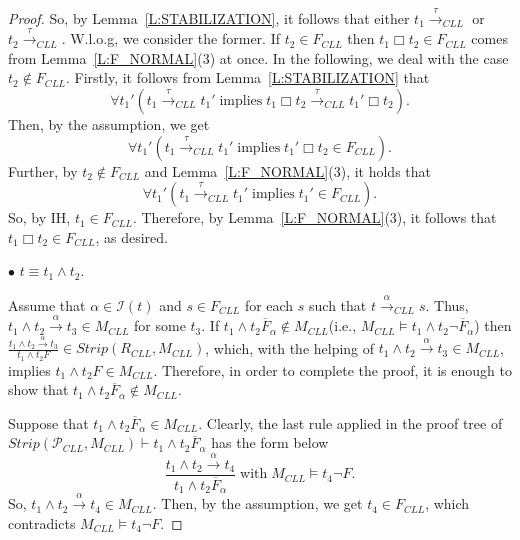 \documentclass{elsarticle}
\theoremstyle{plain}
\theoremstyle{definition}
\begin{document}
\begin{proof}
        So, by Lemma~\ref{L:STABILIZATION}, it follows that either $t_1 \stackrel{\tau}{\longrightarrow}_{CLL}$ or $t_2 \stackrel{\tau}{\longrightarrow}_{CLL}$.
        W.l.o.g, we consider the former.
        If $t_2 \in F_{{CLL}}$ then $t_1\Box t_2 \in F_{{CLL}}$ comes from Lemma~\ref{L:F_NORMAL}(3) at once.
        In the following, we deal with the case $t_2 \notin F_{{CLL}}$.
        Firstly, it follows from Lemma~\ref{L:STABILIZATION} that
        \[\forall t_1' (t_1  \stackrel{\tau}{\longrightarrow}_{CLL} t_1' \;\text{implies}\; t_1 \Box t_2 \stackrel{\tau}{\longrightarrow}_{CLL} t_1'\Box t_2).\]
        Then, by the assumption, we get
        \[\forall t_1' (t_1  \stackrel{\tau}{\longrightarrow}_{CLL} t_1' \;\text{implies}\; t_1' \Box t_2 \in F_{CLL}).\]
        Further, by $t_2 \notin F_{CLL}$ and Lemma~\ref{L:F_NORMAL}(3), it holds that
         \[\forall t_1' (t_1  \stackrel{\tau}{\longrightarrow}_{CLL} t_1' \;\text{implies}\; t_1' \in F_{CLL}).\]
        So, by IH, $t_1 \in F_{{CLL}}$. Therefore, by Lemma~\ref{L:F_NORMAL}(3), it follows that $t_1\Box t_2 \in F_{{CLL}}$, as desired.


  \noindent $\bullet$ $t \equiv t_1 \wedge t_2$.

        Assume that $\alpha \in {\mathcal I}(t)$ and $s \in F_{CLL}$ for each $s$ such that $t \stackrel{\alpha}{\longrightarrow}_{CLL}s$.
        Thus, $ t_1\wedge t_2 \stackrel{\alpha}{\longrightarrow} t_3 \in M_{{CLL}}$ for some $t_3$.
        If $t_1 \wedge t_2 \overline{F}_{\alpha} \notin M_{{CLL}}$(i.e., $M_{{CLL}} \models t_1 \wedge t_2 \neg \overline{F}_{\alpha} $) then $ \frac{t_1\wedge t_2 \stackrel{\alpha}{\longrightarrow} t_3 }{t_1\wedge t_2F}\in Strip(R_{CLL},M_{{CLL}}) $, which, with the helping of $ t_1\wedge t_2 \stackrel{\alpha}{\longrightarrow} t_3 \in M_{{CLL}}$, implies $t_1\wedge t_2F \in M_{{CLL}}$. Therefore, in order to complete the proof, it is enough to show that $t_1 \wedge t_2 \overline{F}_{\alpha} \notin M_{{CLL}}$.

        Suppose that $t_1 \wedge t_2 \overline{F}_{\alpha} \in M_{{CLL}}$. Clearly, the last rule applied in the proof tree of $Strip({\mathcal P}_{CLL},M_{{CLL}})\vdash t_1 \wedge t_2 \overline{F}_{\alpha}$  has the form below
        \[\frac{t_1 \wedge t_2 \stackrel{\alpha}{\longrightarrow} t_4}{t_1 \wedge t_2 \overline{F}_{\alpha}} \; \text{with} \;  M_{{CLL}} \models t_4 \neg F.\]
        So, $t_1 \wedge t_2 \stackrel{\alpha}{\longrightarrow} t_4 \in M_{{CLL}}$. Then, by the assumption, we get $t_4 \in F_{{CLL}}$, which contradicts $M_{{CLL}} \models t_4 \neg F$.


\end{proof}
\end{document}
